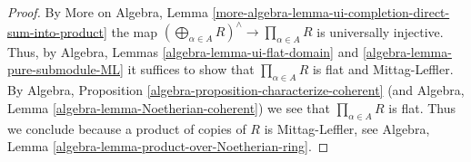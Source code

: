 \documentclass[10pt,a4paper]{amsart}
\theoremstyle{plain}
\theoremstyle{definition}
\theoremstyle{remark}
\numberwithin{equation}{subsection}
\begin{document}
\begin{proof}
By
More on Algebra, Lemma
\ref{more-algebra-lemma-ui-completion-direct-sum-into-product}
the map $(\bigoplus\nolimits_{\alpha \in A} R)^\wedge
\to \prod_{\alpha \in A} R$ is universally injective.
Thus, by
Algebra, Lemmas \ref{algebra-lemma-ui-flat-domain} and
\ref{algebra-lemma-pure-submodule-ML}
it suffices to show that $\prod_{\alpha \in A} R$ is flat and Mittag-Leffler.
By
Algebra, Proposition \ref{algebra-proposition-characterize-coherent}
(and
Algebra, Lemma \ref{algebra-lemma-Noetherian-coherent})
we see that $\prod_{\alpha \in A} R$ is flat.
Thus we conclude because a product of copies of $R$ is Mittag-Leffler, see
Algebra, Lemma \ref{algebra-lemma-product-over-Noetherian-ring}.
\end{proof}
\end{document}
